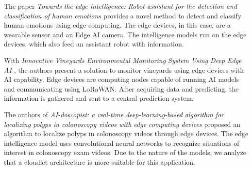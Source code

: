 
The paper \textit{Towards the edge intelligence: Robot assistant for the detection and classification of human emotions \cite{sakib2021deep}} provides a novel method to detect and classify human emotions using edge computing. The edge devices, in this case, are a wearable sensor and an Edge AI camera. The intelligence models run on the edge devices, which also feed an assistant robot with information.



With \textit{Innovative Vineyards Environmental Monitoring System Using Deep Edge AI \cite{coppola2021innovative}}, the authors present a solution to monitor vineyards using edge devices with AI capability. Edge devices are computing nodes capable of running AI models and communicating using LoRaWAN. After acquiring data and predicting, the information is gathered and sent to a central prediction system.



The authors of \textit{AI-doscopist: a real-time deep-learning-based algorithm for localizing polyps in colonoscopy videos with edge computing devices \cite{poon2020ai}} proposed an algorithm to localize polyps in colonoscopy videos through edge devices. The edge intelligence model uses convolutional neural networks to recognize situations of interest in colonoscopy exam videos. Due to the nature of the models, we analyze that a cloudlet architecture is more suitable for this application.


